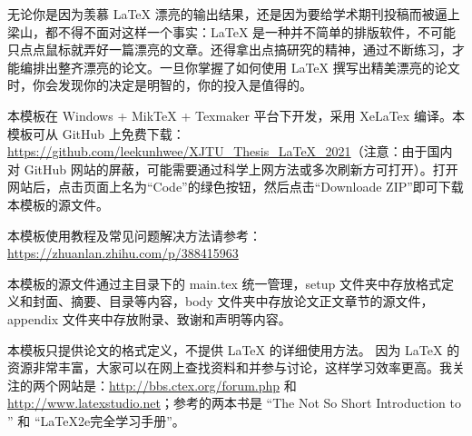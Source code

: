 无论你是因为羡慕 \LaTeX{} 漂亮的输出结果，还是因为要给学术期刊投稿而被逼上梁山，都不得不面对这样一个事实：\LaTeX{} 是一种并不简单的排版软件，不可能只点点鼠标就弄好一篇漂亮的文章。还得拿出点搞研究的精神，通过不断练习，才能编排出整齐漂亮的论文。一旦你掌握了如何使用 \LaTeX{} 撰写出精美漂亮的论文时，你会发现你的决定是明智的，你的投入是值得的。


本模板在 Windows + MikTeX + Texmaker 平台下开发，采用 XeLaTex 编译。本模板可从 GitHub 上免费下载：\url{https://github.com/leekunhwee/XJTU_Thesis_LaTeX_2021}（{\color{red}注意}：由于国内对 GitHub 网站的屏蔽，可能需要通过科学上网方法或多次刷新方可打开）。打开网站后，点击页面上名为“Code”的绿色按钮，然后点击“Downloade ZIP”即可下载本模板的源文件。

{\color{red}本模板使用教程及常见问题解决方法请参考：\url{https://zhuanlan.zhihu.com/p/388415963}}

本模板的源文件通过主目录下的 main.tex 统一管理，setup 文件夹中存放格式定义和封面、摘要、目录等内容，body 文件夹中存放论文正文章节的源文件，appendix 文件夹中存放附录、致谢和声明等内容。  

本模板只提供论文的格式定义，不提供 \LaTeX{} 的详细使用方法。%
因为 \LaTeX{} 的资源非常丰富，大家可以在网上查找资料和并参与讨论，这样学习效率更高。我关注的两个网站是：\url{http://bbs.ctex.org/forum.php} 和 \url{http://www.latexstudio.net}；参考的两本书是 ``The Not So Short Introduction to \LaTeXe'' 和 ``LaTeX2e完全学习手册''。
